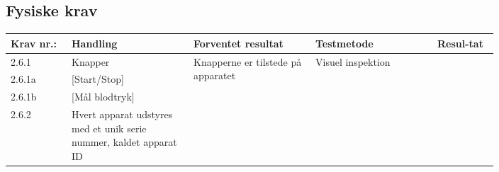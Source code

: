 			\subsection{Fysiske krav}
				\begin{longtable}{|p{0.1\linewidth}|p{0.2\linewidth}|p{0.2\linewidth}|p{0.2\linewidth}|p{0.1\linewidth}|}
					\hline
					Krav nr.: & Handling & Forventet resultat & Testmetode & Resul-tat  \\\hline
					2.6.1& Knapper & \multirow{4}{\linewidth}{Knapperne er tilstede på apparatet}  & \multirow{4}{\linewidth}{Visuel inspektion}  & \multirow{4}{\linewidth}{}  \\ \cline{1-2}
					2.6.1a& [Start/Stop] & &  & \\ \cline{1-2}
					2.6.1b& [Mål blodtryk] & &  & \\ \cline{1-2}
					2.6.2& Hvert apparat udstyres med et unik serie nummer, kaldet apparat ID & &  & \\ \hline
				\end{longtable}
	